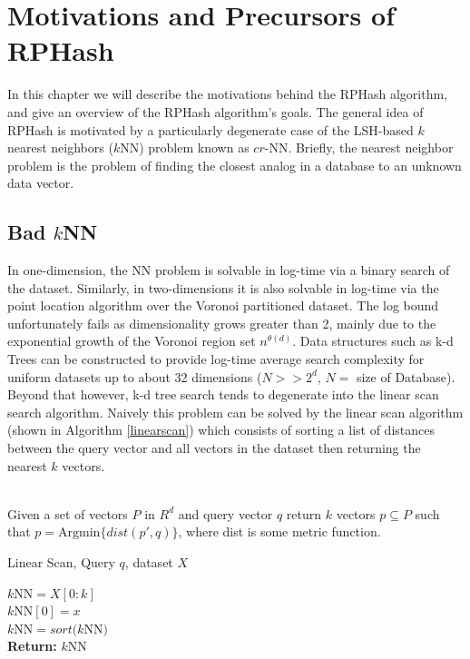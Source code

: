 
\chapter[Motivations and Precursors of RPHash]{Motivations and Precursors of RPHash}
\label{motive}

In this chapter we will describe the motivations behind the \textsf{RPHash} algorithm, and give an overview of the \textsf{RPHash}
algorithm's goals.  The general idea of \textsf{RPHash} is motivated by a particularly degenerate case of the LSH-based $k$
nearest neighbors ($k$NN) problem known as $cr$-NN.  Briefly, the nearest neighbor problem is the problem of finding the
closest analog in a database to an unknown data vector.

\section{Bad $k$NN}
In one-dimension, the NN problem is solvable in log-time via a binary search of the dataset.  Similarly, in
two-dimensions it is also solvable in log-time via the point location algorithm over the Voronoi partitioned dataset.
The log bound unfortunately fails as dimensionality grows greater than 2, mainly due to the exponential growth of the
Voronoi region set $n^{\theta(d)}$.  Data structures such as k-d Trees\cite{Bentley-75} can be constructed to provide log-time average search
complexity for uniform datasets up to about 32 dimensions ($N >> 2^d$, $N=$ size of Database).  Beyond that however, k-d tree
search tends to degenerate into the linear scan search algorithm.  Naively this problem can be solved by the linear scan
algorithm (shown in Algorithm \ref{linearscan}) which consists of sorting a list of distances between the query vector
and all vectors in the dataset then returning the nearest $k$ vectors.

\begin{Definition} \cite{Samet}\\
Given a set of vectors $P$ in $R^d$ and query vector $q$ return $k$ vectors $p\subseteq P$ such that
$p=\text{Argmin}\{dist(p',q)\}$, where dist is some metric function.
\end{Definition}

\begin{algorithm}
\caption{Linear Scan, Query $q$, dataset $X$\label{linearscan}}
\DontPrintSemicolon
$k$NN$ = X[0:k]$\\
{	
      {
	$k$NN$[0]=x$\\
	$k$NN$ = sort(k$NN$)$\\
      }
}
\textbf{Return:} $k$NN
\end{algorithm}

